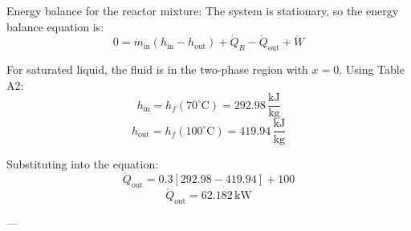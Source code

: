 Energy balance for the reactor mixture:  
The system is stationary, so the energy balance equation is:  
\[
0 = \dot{m}_{\text{in}} \left( h_{\text{in}} - h_{\text{out}} \right) + \dot{Q}_R - \dot{Q}_{\text{out}} + \dot{W}
\]  

For saturated liquid, the fluid is in the two-phase region with \( x = 0 \). Using Table A2:  
\[
h_{\text{in}} = h_f(70^\circ\text{C}) = 292.98 \, \frac{\text{kJ}}{\text{kg}}
\]  
\[
h_{\text{out}} = h_f(100^\circ\text{C}) = 419.94 \, \frac{\text{kJ}}{\text{kg}}
\]  

Substituting into the equation:  
\[
\dot{Q}_{\text{out}} = 0.3 \left[ 292.98 - 419.94 \right] + 100
\]  
\[
\dot{Q}_{\text{out}} = 62.182 \, \text{kW}
\]  

---